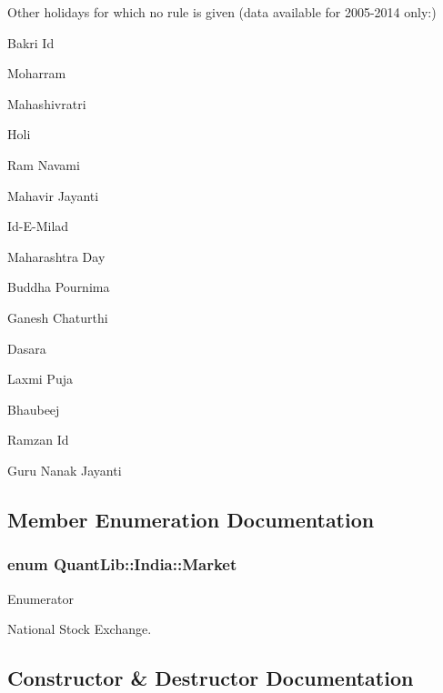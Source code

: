 Other holidays for which no rule is given (data available for 2005-\/2014 only\+:) 
\begin{DoxyItemize}
\item Bakri Id 
\item Moharram 
\item Mahashivratri 
\item Holi 
\item Ram Navami 
\item Mahavir Jayanti 
\item Id-\/\+E-\/\+Milad 
\item Maharashtra Day 
\item Buddha Pournima 
\item Ganesh Chaturthi 
\item Dasara 
\item Laxmi Puja 
\item Bhaubeej 
\item Ramzan Id 
\item Guru Nanak Jayanti 
\end{DoxyItemize}

\subsection{Member Enumeration Documentation}
\subsubsection[{Market}]{\setlength{\rightskip}{0pt plus 5cm}enum {\bf Quant\+Lib\+::\+India\+::\+Market}}\label{class_quant_lib_1_1_india_a60abb514b948e3ecf0227b7002c99a61}
\begin{Desc}
\item[Enumerator]\par
\begin{description}
\item[{\em 
N\+SE\label{class_quant_lib_1_1_india_a60abb514b948e3ecf0227b7002c99a61a9e8b3e32c1a855243e9b42d04b488c1e}
}]National Stock Exchange. \end{description}
\end{Desc}


\subsection{Constructor \& Destructor Documentation}
